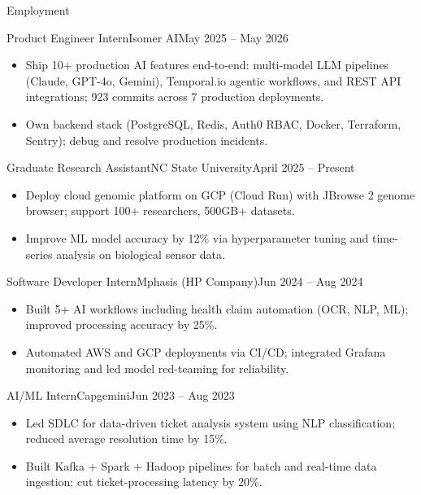 \documentclass[]{mcdowellcv}
\begin{document}
\makeheader

\begin{cvsection}{Employment}
  \begin{cvsubsection}{Product Engineer Intern}{Isomer AI}{May 2025 -- May 2026}
    \begin{itemize}
      \item Ship 10+ production AI features end-to-end: multi-model LLM pipelines (Claude, GPT-4o, Gemini), Temporal.io agentic workflows, and REST API integrations; 923 commits across 7 production deployments.
      \item Own backend stack (PostgreSQL, Redis, Auth0 RBAC, Docker, Terraform, Sentry); debug and resolve production incidents.
    \end{itemize}
    \vspace{-1.5pt}
  \end{cvsubsection}

  \begin{cvsubsection}{Graduate Research Assistant}{NC State University}{April 2025 -- Present}
    \begin{itemize}
      \item Deploy cloud genomic platform on GCP (Cloud Run) with JBrowse 2 genome browser; support 100+ researchers, 500GB+ datasets.
      \item Improve ML model accuracy by 12\% via hyperparameter tuning and time-series analysis on biological sensor data.
    \end{itemize}
    \vspace{-1.5pt}
  \end{cvsubsection}

  \begin{cvsubsection}{Software Developer Intern}{Mphasis (HP Company)}{Jun 2024 -- Aug 2024}
    \begin{itemize}
      \item Built 5+ AI workflows including health claim automation (OCR, NLP, ML); improved processing accuracy by 25\%.
      \item Automated AWS and GCP deployments via CI/CD; integrated Grafana monitoring and led model red-teaming for reliability.
    \end{itemize}
    \vspace{-1.5pt}
  \end{cvsubsection}

  \begin{cvsubsection}{AI/ML Intern}{Capgemini}{Jun 2023 -- Aug 2023}
    \begin{itemize}
      \item Led SDLC for data-driven ticket analysis system using NLP classification; reduced average resolution time by 15\%.
      \item Built Kafka + Spark + Hadoop pipelines for batch and real-time data ingestion; cut ticket-processing latency by 20\%.
    \end{itemize}
    \vspace{-1.5pt}
  \end{cvsubsection}
\end{cvsection}
\end{document}
